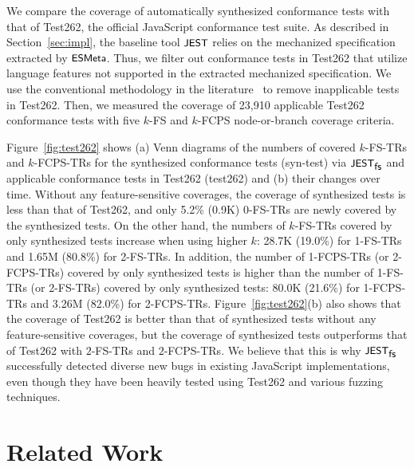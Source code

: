 \documentclass[acmsmall,review,screen]{acmart}
\newcommand{\name}[1]{\textsf{#1}}
\newcommand{\sname}[1]{\name{\small #1}}
\newcommand{\jest}{\sname{JEST}}
\newcommand{\esmeta}{\sname{ESMeta}}
\newcommand{\tool}{\jest_{\sname{fs}}}
\begin{document}

We compare the coverage of automatically synthesized conformance tests with that
of Test262, the official JavaScript conformance test suite.
As described in Section~\ref{sec:impl}, the baseline tool $\jest$ relies on the
mechanized specification extracted by $\esmeta$.
Thus, we filter out conformance tests in Test262 that utilize language
features not supported in the extracted mechanized specification.
We use the conventional methodology in the literature~\cite{kjs, jiset, javert}
to remove inapplicable tests in Test262.
Then, we measured the coverage of 23,910 applicable Test262 conformance tests
with five $k$-FS and $k$-FCPS node-or-branch coverage criteria.


Figure~\ref{fig:test262} shows
(a) Venn diagrams of
the numbers of covered $k$-FS-TRs and 
$k$-FCPS-TRs for the synthesized conformance tests (\sname{syn-test}) via
$\tool$ and applicable conformance tests in Test262 (\sname{test262}) and
(b) their changes over time.
Without any feature-sensitive coverages, the coverage of synthesized tests is
less than that of Test262, and only 5.2\% (0.9K) 0-FS-TRs are newly covered by
the synthesized tests.
%
On the other hand, the numbers of $k$-FS-TRs covered by only synthesized tests
increase when using higher $k$: 28.7K (19.0\%) for 1-FS-TRs and 1.65M (80.8\%)
for 2-FS-TRs.
%
In addition, the number of 1-FCPS-TRs (or 2-FCPS-TRs) covered by only
synthesized tests is higher than the number of 1-FS-TRs (or 2-FS-TRs)
covered by only synthesized tests:
80.0K (21.6\%) for 1-FCPS-TRs and 3.26M (82.0\%) for 2-FCPS-TRs.
Figure~\ref{fig:test262}(b) also shows that the coverage of Test262 is
better than that of synthesized tests without any feature-sensitive
coverages, but the coverage of synthesized tests outperforms that of
Test262 with $2$-FS-TRs and $2$-FCPS-TRs.
%
We believe that this is why $\tool$ successfully detected diverse new bugs in
existing JavaScript implementations, even though they have been heavily tested
using Test262 and various fuzzing techniques.

\section{Related Work}\label{sec:related}
\end{document}
